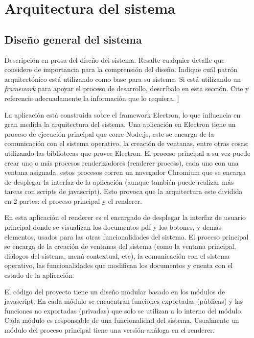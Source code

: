 \chapter{Arquitectura del sistema}
\section{Diseño general del sistema}

Descripción en prosa del diseño del sistema. Resalte cualquier detalle que considere de importancia para la comprensión del diseño. Indique cuál patrón arquitectónico está utilizando como base para su sistema. Si está utilizando un \textit{framework} para apoyar el proceso de desarrollo, descríbalo en esta sección. Cite y referencie adecuadamente la información que lo requiera.
]

La aplicación está construida sobre el framework Electron, lo que influencia en gran medida la arquitectura del sistema. Una aplicación en Electron tiene un proceso de ejecución principal que corre Node.js, este se encarga de la comunicación con el sistema operativo, la creación de ventanas, entre otras cosas; utilizando las bibliotecas que provee Electron. El proceso principal a su vez puede crear uno o más procesos renderizadores (renderer process), cada uno con una ventana asignada, estos procesos corren un navegador Chromium que se encarga de desplegar la interfaz de la aplicación (aunque también puede realizar más tareas con scripts de javascript). Esto provoca que la arquitectura este dividida en 2 partes: el proceso principal y el renderer. 

En esta aplicación el renderer es el encargado de desplegar la interfaz de usuario principal donde se  visualizan los documentos pdf y los botones, y demás elementos, usados para las otras funcionalidades del sistema. El proceso principal se encarga de la creación de ventanas del sistema (como la ventana principal, diálogos del sistema, menú contextual, etc), la comunicación con el sistema operativo, las funcionalidades que modifican los documentos y cuenta con el estado de la aplicación.

El código del proyecto tiene un diseño modular basado en los módulos de javascript. En cada módulo se encuentran funciones exportadas (públicas) y las funciones no exportadas (privadas) que solo se utilizan a lo interno del módulo. Cada módulo es responsable de una funcionalidad del sistema. Usualmente un módulo del proceso principal tiene una versión análoga en el renderer.

